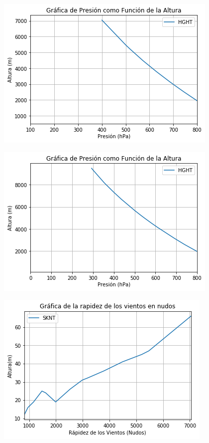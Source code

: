 \documentclass{article}
\begin{document}
\begin{figure}
  \includegraphics[width=\linewidth]{presiondic.png}
\end{figure}

\begin{figure}
  \includegraphics[width=\linewidth]{presionjun.png}
\end{figure}

\begin{figure}
  \includegraphics[width=\linewidth]{rapidezvientos.png}
\end{figure}
\end{document}
